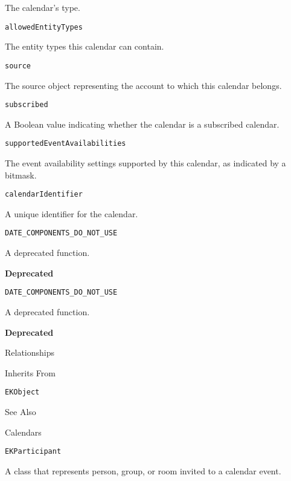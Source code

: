 \documentclass{article}
\begin{document}
The calendar's type.

\texttt{allowedEntityTypes}

The entity types this calendar can contain.

\texttt{source}

The source object representing the account to which this calendar belongs.

\texttt{subscribed}

A Boolean value indicating whether the calendar is a subscribed calendar.

\texttt{supportedEventAvailabilities}

The event availability settings supported by this calendar, as indicated by a bitmask.

\texttt{calendarIdentifier}

A unique identifier for the calendar.

\texttt{DATE\_COMPONENTS\_DO\_NOT\_USE}

A deprecated function.

\textbf{Deprecated}

\texttt{DATE\_COMPONENTS\_DO\_NOT\_USE}

A deprecated function.

\textbf{Deprecated}

Relationships

Inherits From

\texttt{EKObject}

See Also

Calendars

\texttt{EKParticipant}

A class that represents person, group, or room invited to a calendar event.
\newpage
\end{document}
